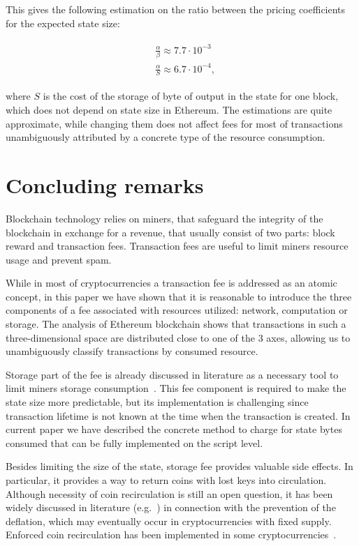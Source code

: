 \documentclass[]{llncs}   %
\begin{document}
This gives the following estimation on the ratio between the pricing coefficients for the expected state size:

\begin{align}
\begin{split}
&\frac{\alpha}{\beta} \approx 7.7\cdot10^{-3} \\
&\frac{\alpha}{S} \approx 6.7\cdot10^{-4},
\end{split}
\end{align}

where $S$ is the cost of the storage of byte of output in the state for one block, which does
not depend on state size in Ethereum. The estimations are quite approximate, while changing
them does not affect fees for most of transactions unambiguously attributed by a concrete type of the resource consumption.

\section{Concluding remarks}
\label{sec:conslusion}

Blockchain technology relies on miners, that safeguard the integrity of the blockchain
in exchange for a revenue, that usually consist of two parts: block reward and transaction fees.
Transaction fees are useful to limit miners resource usage and prevent spam.

While in most of cryptocurrencies a transaction fee is addressed as an atomic concept,
in this paper we have shown that it is reasonable to introduce the three
components of a fee associated with resources utilized: network, computation or storage.
The analysis of Ethereum blockchain shows that transactions in such a three-dimensional space are
distributed close to one of the 3 axes, allowing us to
unambiguously classify transactions by consumed resource.

Storage part of the fee is already discussed in literature as a
necessary tool to limit miners storage consumption~\cite{Moeser2015,reyzin2016improving}.
This fee component is required to make the state size more predictable, but its implementation is
challenging since transaction lifetime is not known at the time when the transaction is
created. In current paper we have described the concrete method to charge for state bytes consumed
that can be fully implemented on the script level.

Besides limiting the size of the state, storage fee provides valuable side effects.
In particular, it provides a way to return coins with lost keys into circulation.
Although necessity of coin recirculation is still an open question, it
has been widely discussed in literature (e.g.~\cite{gjermundrod2014recirculating,gjermundrod2016going})
in connection with the prevention of the deflation, which may eventually occur in cryptocurrencies with fixed supply. Enforced coin recirculation has been implemented in some cryptocurrencies~\cite{freicoin}.
\end{document}
